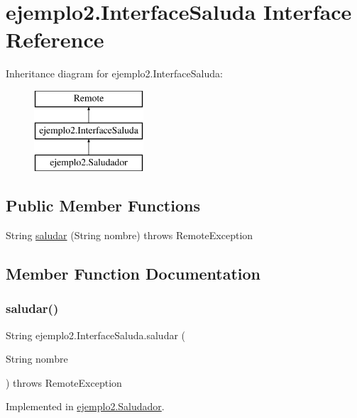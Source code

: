 \hypertarget{interfaceejemplo2_1_1_interface_saluda}{}\section{ejemplo2.\+Interface\+Saluda Interface Reference}
\label{interfaceejemplo2_1_1_interface_saluda}
Inheritance diagram for ejemplo2.\+Interface\+Saluda\+:\begin{figure}[H]
\begin{center}
\leavevmode
\includegraphics[height=3.000000cm]{interfaceejemplo2_1_1_interface_saluda}
\end{center}
\end{figure}
\subsection*{Public Member Functions}
\begin{DoxyCompactItemize}
\item 
String \mbox{\hyperlink{interfaceejemplo2_1_1_interface_saluda_a0594b234523ba7e36f0fb05b6f2d007e}{saludar}} (String nombre)  throws Remote\+Exception
\end{DoxyCompactItemize}


\subsection{Member Function Documentation}
\mbox{\label{interfaceejemplo2_1_1_interface_saluda_a0594b234523ba7e36f0fb05b6f2d007e}} 
\subsubsection{\texorpdfstring{saludar()}{saludar()}}
{\footnotesize\ttfamily String ejemplo2.\+Interface\+Saluda.\+saludar (\begin{DoxyParamCaption}\item[{String}]{nombre }\end{DoxyParamCaption}) throws Remote\+Exception}



Implemented in \mbox{\hyperlink{classejemplo2_1_1_saludador_a5db6e424a0c2570a9b66f4828041f9b3}{ejemplo2.\+Saludador}}.

